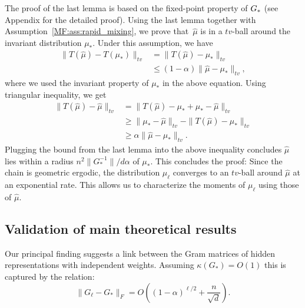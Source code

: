 The proof of the last lemma is based on the fixed-point property of ${G_*}$ (see Appendix for the detailed proof). Using the last lemma together with
Assumption~\ref{MF:ass:rapid_mixing}, we prove that~$\hat \mu$ is in a $tv$-ball around the invariant distribution $\mu_*$. Under this assumption, we have 
\begin{equation}
\begin{aligned}
    \| T(\hat \mu)-T(\mu_*)\|_{tv} &= \|T(\hat \mu)-\mu_*\|_{tv} \\
    & \leq (1-\alpha) \|\hat \mu- \mu_*\|_{tv},
\end{aligned}
\end{equation}
where we used the invariant property of $\mu_*$ in the above equation. 
Using triangular inequality, we get 
\begin{equation}
\begin{aligned}
    \| T(\hat \mu) - \hat \mu\|_{tv} & = \| T(\hat \mu) -\mu_* +\mu_*- \hat \mu\|_{tv} \\ 
    & \geq \| \mu_*- \hat \mu\|_{tv} -\|T(\hat \mu) - \mu_*\|_{tv} \\ 
    & \geq \alpha \| \hat\mu-\mu_* \|_{tv}.
\end{aligned}
\end{equation}
Plugging the bound from the last lemma into the above inequality concludes $\hat \mu$ lies within a radius $n^2\|G_*^{-1}\|/d\alpha$ of $\mu_*$. This concludes the proof: Since the chain is geometric ergodic, the distribution $\mu_\ell$ converges to an $tv$-ball around $\hat \mu$ at an exponential rate. This allows us to characterize the moments of $ \mu_\ell$ using those of $\hat \mu$. 

\subsection{Validation of main theoretical results}
Our principal finding suggests a link between the Gram matrices of hidden representations with independent weights. Assuming $\kappa(G_*)=O(1)$ this is captured by the relation:
\begin{equation}
\|G_\ell - G_*\|_F =O\left((1-\alpha)^{\ell/2} + \frac{n}{\sqrt{d}}\right).
\end{equation}

